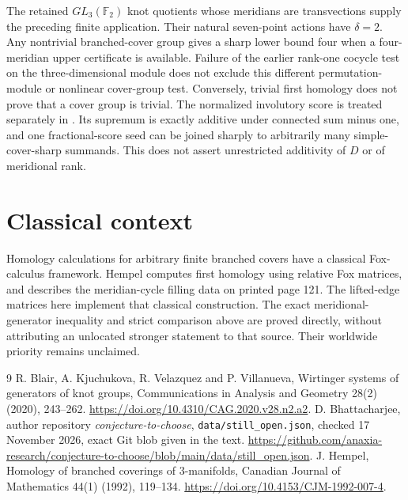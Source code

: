 \documentclass[11pt]{article}
\newcommand{\F}{\mathbb F}
\begin{document}
The retained $GL_3(\F_2)$ knot quotients whose
meridians are transvections supply the preceding finite application. Their natural seven-point actions have
$\delta=2$. Any nontrivial branched-cover group gives a sharp lower
bound four when a four-meridian upper certificate is available.
Failure of the earlier rank-one cocycle test on the three-dimensional
module does not exclude this different permutation-module or nonlinear
cover-group test. Conversely, trivial first homology does not prove
that a cover group is trivial.
The normalized involutory score is treated separately in
. Its supremum is exactly
additive under connected sum minus one, and one fractional-score
seed can be joined sharply to arbitrarily many simple-cover-sharp
summands. This does not assert unrestricted additivity of $D$ or
of meridional rank.

\section{Classical context}

Homology calculations for arbitrary finite branched covers have a
classical Fox-calculus framework. Hempel \cite[Section 3, Theorems
3.1--3.2]{hempel} computes first homology using relative Fox matrices,
and describes the meridian-cycle filling data on printed page 121.
The lifted-edge matrices here implement that classical construction.
The exact meridional-generator inequality and strict comparison above
are proved directly, without attributing an unlocated stronger
statement to that source. Their worldwide priority remains unclaimed.

\begin{thebibliography}{9}
 R. Blair, A. Kjuchukova, R. Velazquez and P. Villanueva,
Wirtinger systems of generators of knot groups,
Communications in Analysis and Geometry 28(2) (2020), 243--262.
\url{https://doi.org/10.4310/CAG.2020.v28.n2.a2}.
 D. Bhattacharjee, author repository
\emph{conjecture-to-choose}, \texttt{data/still\_open.json}, checked
17 November 2026, exact Git blob given in the text.
\url{https://github.com/anaxia-research/conjecture-to-choose/blob/main/data/still_open.json}.
 J. Hempel, Homology of branched coverings of
3-manifolds, Canadian Journal of Mathematics 44(1) (1992), 119--134.
\url{https://doi.org/10.4153/CJM-1992-007-4}.
\end{thebibliography}
\end{document}
